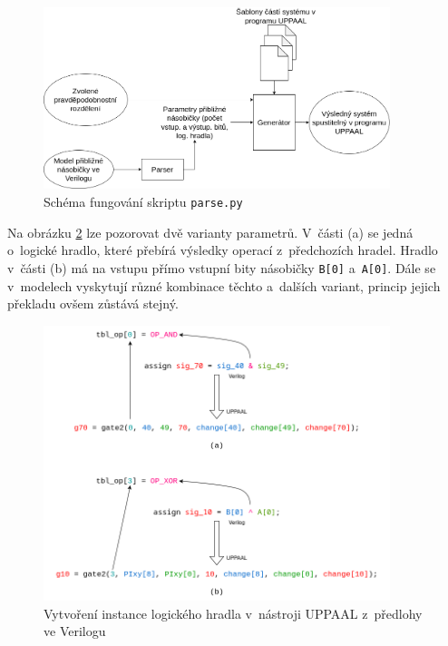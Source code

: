 \begin{figure}[H]
    \centering
    \includegraphics[width=0.9\textwidth]{obrazky-figures/parser_diagram.png}
    \caption{Schéma fungování skriptu \texttt{parse.py}}
    \label{fig:parser_diagram}
\end{figure}

Na obrázku \ref{fig:sig_to_gate} lze pozorovat dvě varianty parametrů. V~části (a) se jedná o~logické hradlo, které přebírá výsledky operací z~předchozích hradel. Hradlo v~části (b) má na vstupu přímo vstupní bity násobičky \texttt{B[0]} a~\texttt{A[0]}. Dále se v~modelech vyskytují různé kombinace těchto a~dalších variant, princip jejich překladu ovšem zůstává stejný.

\begin{figure}[H]
    \centering
    \includegraphics[width=0.9\textwidth]{obrazky-figures/sig_to_gate.png}
    \caption{Vytvoření instance logického hradla v~nástroji UPPAAL z~předlohy ve Verilogu}
    \label{fig:sig_to_gate}
\end{figure}

